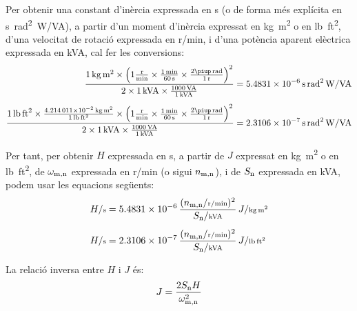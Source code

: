 Per  obtenir una constant d'inèrcia  expressada en \unit{s} (o de forma més explícita en \unit{s.rad^2.W/VA}), a partir d'un moment d'inèrcia expressat en \unit{kg.m^2} o en \unit{lb.ft^2}, d'una velocitat de rotació expressada en \unit{r/min}, i d'una potència aparent elèctrica expressada en \unit{kVA}, cal  fer les conversions:
\begin{subequations}
\begin{align}
    \frac{\qty{1}{kg.m^2} \times \left(1\frac{\unit{r}}{\unit{min}} \times \frac{\qty{1}{min}}{\qty{60}{s}} \times \frac{2\piup\,\unit{rad}}{\qty{1}{r}}\right)^2}{2\times \qty{1}{kVA} \times \frac{\qty{1000}{VA}}{\qty{1}{kVA}}}  &= \qty{5,4831e-6}{s.rad^2.W/VA} \\[1ex]
   \frac{\qty{1}{lb.ft^2} \times \frac{\qty{4,214011e-2}{kg.m^2}}{\qty{1}{lb.ft^2}} \times \left(1\frac{\unit{r}}{\unit{min}} \times \frac{\qty{1}{min}}{\qty{60}{s}} \times \frac{2\piup\,\unit{rad}}{\qty{1}{r}}\right)^2}{2\times \qty{1}{kVA}  \times
   \frac{\qty{1000}{VA}}{\qty{1}{kVA}}} &= \qty{2,3106e-7}{s.rad^2.W/VA}
\end{align}
\end{subequations}

Per tant, per  obtenir $H$ expressada en \unit{s}, a partir de $J$  expressat en \unit{kg.m^2} o en \unit{lb.ft^2}, de $\omega_\mathrm{m,n}$ expressada en \unit{r/min} (o sigui $n_\mathrm{m,n}$), i de $S_\mathrm{n}$ expressada en \unit{kVA}, podem usar les equacions següents:
\begin{subequations}
\begin{align}
    H/{\scriptstyle \unit{s}} &= \num{5,4831e-6}\,  \frac{(n\ped{m,n}/{\scriptstyle \unit{r/min}})^2}{S\ped{n}/{\scriptstyle \unit{kVA}}} \, J/{\scriptstyle \unit{kg.m^2}} \\[1ex]
    H/{\scriptstyle \unit{s}} &= \num{2,3106e-7}\,  \frac{(n\ped{m,n}/{\scriptstyle \unit{r/min}})^2}{S\ped{n}/{\scriptstyle \unit{kVA}}} \, J/{\scriptstyle \unit{lb.ft^2}}
\end{align}
\end{subequations}

La relació inversa entre $H$ i $J$ és:
\begin{equation}
    J = \frac{2 S_\mathrm{n} H}{\omega_\mathrm{m,n}^2}
\end{equation}

